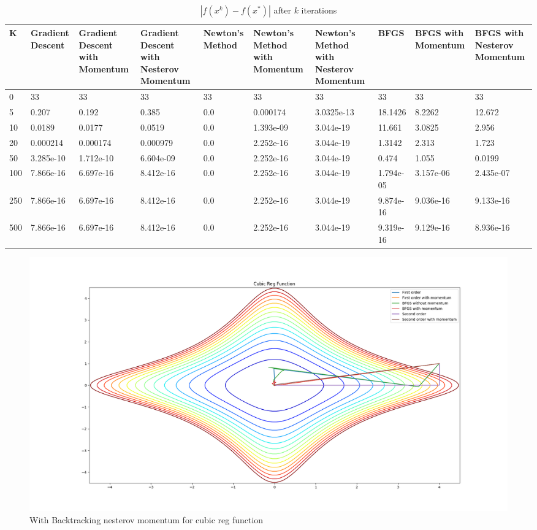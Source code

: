 \documentclass{article}
\begin{document}
\begin{center}
\begin{table}[H]
	\centering
	\caption{$ | f(x^k) - f(x^*) | $ after $k$ iterations}
	\label{Cubic Reg function table}
	\begin{tabular}{|l|p{1.2cm}|p{1.2cm}|p{1.2cm}|p{1.2cm}|p{1.2cm}|p{1.2cm}|p{1.2cm}|p{1.2cm}|p{1.2cm}|}
		\hline
		K & Gradient Descent & Gradient Descent with Momentum & Gradient Descent with Nesterov Momentum & Newton's Method & Newton's Method with Momentum & Newton's Method with Nesterov Momentum & BFGS & BFGS with Momentum & BFGS with Nesterov Momentum \\
		\hline
		0 & 33 & 33 & 33 & 33 & 33 & 33 & 33 & 33 & 33 \\
		\hline
		5 & 0.207 & 0.192 & 0.385 & 0.0 & 0.000174 & 3.0325e-13 & 18.1426 & 8.2262 & 12.672 \\
		\hline
		10 & 0.0189 & 0.0177 & 0.0519 & 0.0 & 1.393e-09 & 3.044e-19 & 11.661 & 3.0825 & 2.956 \\
		\hline
		20 & 0.000214 & 0.000174 & 0.000979 & 0.0 & 2.252e-16 & 3.044e-19 & 1.3142 & 2.313 & 1.723 \\
		\hline
		50 & 3.285e-10 & 1.712e-10 & 6.604e-09 & 0.0 & 2.252e-16 & 3.044e-19 & 0.474 & 1.055 & 0.0199 \\
		\hline
		100 & 7.866e-16 & 6.697e-16 & 8.412e-16 & 0.0 & 2.252e-16 & 3.044e-19 & 1.794e-05 & 3.157e-06 & 2.435e-07 \\
		\hline
		250 & 7.866e-16 & 6.697e-16 & 8.412e-16 & 0.0 & 2.252e-16 & 3.044e-19 & 9.874e-16 & 9.036e-16 & 9.133e-16 \\
		\hline
		500 & 7.866e-16 & 6.697e-16 & 8.412e-16 & 0.0 & 2.252e-16 & 3.044e-19 & 9.319e-16 & 9.129e-16 & 8.936e-16 \\
		\hline
	\end{tabular}
\end{table}

\begin{figure}[H]
	\includegraphics[width=\linewidth]{../Images/cubicregbacktrack.png}
	\caption{With Backtracking nesterov momentum for cubic reg function}
	\label{fig:With Backtracking nesterov momentum for cubic reg function}
\end{figure}


\end{center}
\end{document}
